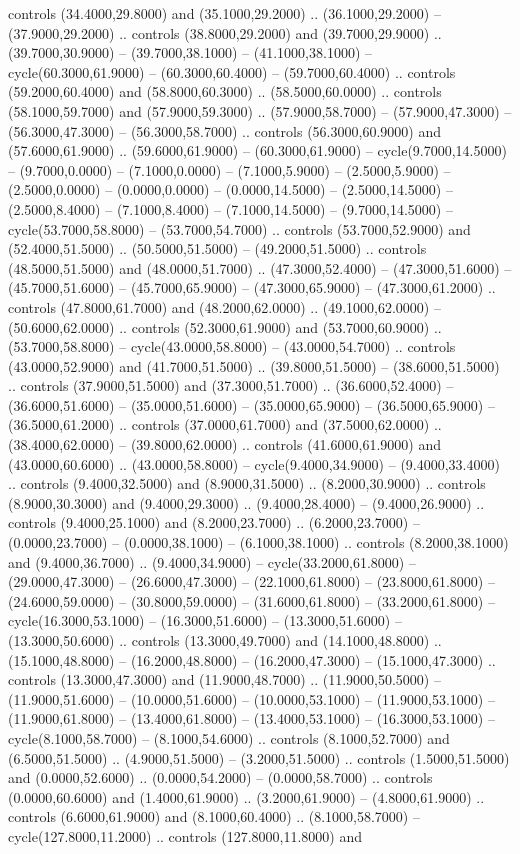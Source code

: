 controls (34.4000,29.8000) and (35.1000,29.2000) .. (36.1000,29.2000) -- (37.9000,29.2000) .. controls (38.8000,29.2000) and (39.7000,29.9000) .. (39.7000,30.9000) -- (39.7000,38.1000) -- (41.1000,38.1000) -- cycle(60.3000,61.9000) -- (60.3000,60.4000) -- (59.7000,60.4000) .. controls (59.2000,60.4000) and (58.8000,60.3000) .. (58.5000,60.0000) .. controls (58.1000,59.7000) and (57.9000,59.3000) .. (57.9000,58.7000) -- (57.9000,47.3000) -- (56.3000,47.3000) -- (56.3000,58.7000) .. controls (56.3000,60.9000) and (57.6000,61.9000) .. (59.6000,61.9000) -- (60.3000,61.9000) -- cycle(9.7000,14.5000) -- (9.7000,0.0000) -- (7.1000,0.0000) -- (7.1000,5.9000) -- (2.5000,5.9000) -- (2.5000,0.0000) -- (0.0000,0.0000) -- (0.0000,14.5000) -- (2.5000,14.5000) -- (2.5000,8.4000) -- (7.1000,8.4000) -- (7.1000,14.5000) -- (9.7000,14.5000) -- cycle(53.7000,58.8000) -- (53.7000,54.7000) .. controls (53.7000,52.9000) and (52.4000,51.5000) .. (50.5000,51.5000) -- (49.2000,51.5000) .. controls (48.5000,51.5000) and (48.0000,51.7000) .. (47.3000,52.4000) -- (47.3000,51.6000) -- (45.7000,51.6000) -- (45.7000,65.9000) -- (47.3000,65.9000) -- (47.3000,61.2000) .. controls (47.8000,61.7000) and (48.2000,62.0000) .. (49.1000,62.0000) -- (50.6000,62.0000) .. controls (52.3000,61.9000) and (53.7000,60.9000) .. (53.7000,58.8000) -- cycle(43.0000,58.8000) -- (43.0000,54.7000) .. controls (43.0000,52.9000) and (41.7000,51.5000) .. (39.8000,51.5000) -- (38.6000,51.5000) .. controls (37.9000,51.5000) and (37.3000,51.7000) .. (36.6000,52.4000) -- (36.6000,51.6000) -- (35.0000,51.6000) -- (35.0000,65.9000) -- (36.5000,65.9000) -- (36.5000,61.2000) .. controls (37.0000,61.7000) and (37.5000,62.0000) .. (38.4000,62.0000) -- (39.8000,62.0000) .. controls (41.6000,61.9000) and (43.0000,60.6000) .. (43.0000,58.8000) -- cycle(9.4000,34.9000) -- (9.4000,33.4000) .. controls (9.4000,32.5000) and (8.9000,31.5000) .. (8.2000,30.9000) .. controls (8.9000,30.3000) and (9.4000,29.3000) .. (9.4000,28.4000) -- (9.4000,26.9000) .. controls (9.4000,25.1000) and (8.2000,23.7000) .. (6.2000,23.7000) -- (0.0000,23.7000) -- (0.0000,38.1000) -- (6.1000,38.1000) .. controls (8.2000,38.1000) and (9.4000,36.7000) .. (9.4000,34.9000) -- cycle(33.2000,61.8000) -- (29.0000,47.3000) -- (26.6000,47.3000) -- (22.1000,61.8000) -- (23.8000,61.8000) -- (24.6000,59.0000) -- (30.8000,59.0000) -- (31.6000,61.8000) -- (33.2000,61.8000) -- cycle(16.3000,53.1000) -- (16.3000,51.6000) -- (13.3000,51.6000) -- (13.3000,50.6000) .. controls (13.3000,49.7000) and (14.1000,48.8000) .. (15.1000,48.8000) -- (16.2000,48.8000) -- (16.2000,47.3000) -- (15.1000,47.3000) .. controls (13.3000,47.3000) and (11.9000,48.7000) .. (11.9000,50.5000) -- (11.9000,51.6000) -- (10.0000,51.6000) -- (10.0000,53.1000) -- (11.9000,53.1000) -- (11.9000,61.8000) -- (13.4000,61.8000) -- (13.4000,53.1000) -- (16.3000,53.1000) -- cycle(8.1000,58.7000) -- (8.1000,54.6000) .. controls (8.1000,52.7000) and (6.5000,51.5000) .. (4.9000,51.5000) -- (3.2000,51.5000) .. controls (1.5000,51.5000) and (0.0000,52.6000) .. (0.0000,54.2000) -- (0.0000,58.7000) .. controls (0.0000,60.6000) and (1.4000,61.9000) .. (3.2000,61.9000) -- (4.8000,61.9000) .. controls (6.6000,61.9000) and (8.1000,60.4000) .. (8.1000,58.7000) -- cycle(127.8000,11.2000) .. controls (127.8000,11.8000) and 